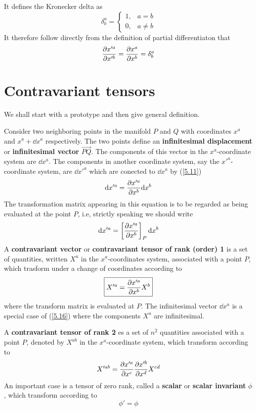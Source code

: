 It defines the Kronecker delta as
\begin{equation}
  \delta_b^{a}=\left\{ \begin{array}{lc}
    1 ,& a=b\\
  0 ,& a\neq b\end{array}\right.
\end{equation}
It therefore follow directly from the definition of partial differentiaton that
\begin{equation}                                \label{5.13}
  \pdv{x'^{a}}{x'^b}=\pdv{x^{a}}{x^b}=\delta_b^{a}
\end{equation}

\section{Contravariant tensors}
We shall start with a prototype and then give general definition.

Consider two neighboring points in the manifold $P$ and $Q$ with coordinates $x^{a}$ and $x^{a}+\dd x^{a}$  respectively. The two points define an \textbf{infinitesimal displacement} or \textbf{infinitesimal vector} $\overrightarrow{PQ}$. The components of this vector in the $x^{a}$-coordinate system are $\dd x^{a}$. The components in another coordinate system, say the $x'^{a}$-coordinate system, are $\dd x'^{a}$ which are conected to $\dd x^{a}$ by (\ref{5.11})
\begin{equation}\label{4.14}
  \dd x'^{a}=\pdv{x'^{a}}{x^b}\dd x^b
\end{equation}
The transformation matrix appearing in this equation is to be regarded as being evaluated at the point $P$, i.e, strictly speaking we should write 
\begin{equation}\label{5.15}
  \dd x'^{a}=\left[\pdv{x'^{a}}{x^b}\right]_P\dd x^b 
\end{equation}
A \textbf{contravariant vector} or \textbf{contravariant tensor of rank (order) 1} is a set of quantities, written $X^{a}$ in the $x^{a}$-coordinates system, associated with a point $P$, which trasform under a change of coordinates according to
\begin{equation}\label{5.16}
  \boxed{X'^{a}=\pdv{x'^{a}}{x^b}X^b }
\end{equation}
where the transform matrix is evaluated at $P$. The infinitesimal vector $\dd x^{a}$ is a special case of (\ref{5.16}) where the components $X^{a}$ are infinitesimal. 

A \textbf{contravariant tensor of rank 2} es a set of $n^2$ quantities associated with a point $P$, denoted by $X^{ab}$ in the $x^{a}$-coordinate system, which transform according to 
\begin{equation}\label{5.17}
  X'^{ab}=\pdv{x'^{a}}{x^c}\pdv{x'^b}{x^d}X^{cd }
\end{equation}
An important case is a tensor of zero rank, called a \textbf{scalar} or \textbf{scalar invariant} $\phi$, which transform according to 
\begin{equation}\label{5.18}
  \boxed{\phi' =\phi}
\end{equation}
